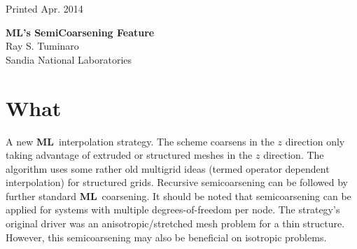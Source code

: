 \documentclass{article}[11pt]
\newcommand{\ML}     {{\bf ML}}
\begin{document}
\begin{center}

Printed Apr. 2014
\end{center}

\vspace{0.1in}

\begin{center}
{\Large {\bf ML's SemiCoarsening Feature}}\\
\vspace*{0.4in}
Ray S. Tuminaro \\
Sandia National Laboratories
\vspace*{.5in}
\end{center}
\begin{abstract}
An addition to the standard \ML\ manual describing a new semicoarsening
feature.
\end{abstract}
%
\section{What}
%
A new  \ML\  interpolation strategy.  The scheme coarsens in the $z$ direction only
taking advantage of extruded or structured meshes in the $z$ direction. The 
algorithm uses some rather old multigrid ideas (termed operator dependent 
interpolation) for structured grids.  Recursive semicoarsening can be followed
by further standard  \ML\  coarsening. It should be noted that semicoarsening can 
be applied for systems with multiple degrees-of-freedom per node. The strategy's
original driver was an anisotropic/stretched mesh problem for a thin structure.
However, this semicoarsening may also be beneficial on isotropic problems.

%
\end{document}
